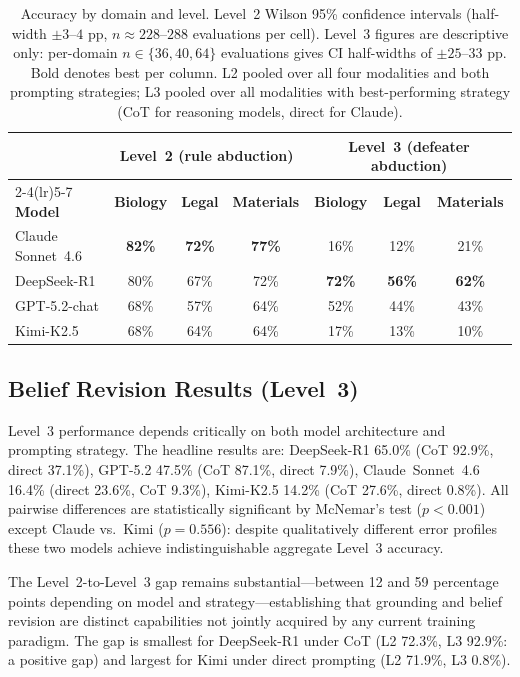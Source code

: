 \documentclass{article}
\theoremstyle{definition}
\begin{document}
\begin{table}[t]
\centering
\caption{Accuracy by domain and level. Level~2 Wilson 95\% confidence intervals (half-width $\pm 3$--$4$ pp, $n \approx 228$--$288$ evaluations per cell). Level~3 figures are descriptive only: per-domain $n \in \{36, 40, 64\}$ evaluations gives CI half-widths of $\pm 25$--$33$ pp. Bold denotes best per column. L2 pooled over all four modalities and both prompting strategies; L3 pooled over all modalities with best-performing strategy (CoT for reasoning models, direct for Claude).}
\label{tab:domain_breakdown}
\small
\setlength{\tabcolsep}{5pt}
\begin{tabular}{@{}lcccccc@{}}
\toprule
 & \multicolumn{3}{c}{\textbf{Level~2 (rule abduction)}} & \multicolumn{3}{c}{\textbf{Level~3 (defeater abduction)}} \\
\cmidrule(lr){2-4}\cmidrule(lr){5-7}
\textbf{Model} & \textbf{Biology} & \textbf{Legal} & \textbf{Materials} & \textbf{Biology} & \textbf{Legal} & \textbf{Materials} \\
\midrule
Claude Sonnet~4.6   & \textbf{82\%} & \textbf{72\%} & \textbf{77\%} & 16\% & 12\% & 21\% \\
DeepSeek-R1         & 80\% & 67\% & 72\% & \textbf{72\%} & \textbf{56\%} & \textbf{62\%} \\
GPT-5.2-chat        & 68\% & 57\% & 64\% & 52\% & 44\% & 43\% \\
Kimi-K2.5           & 68\% & 64\% & 64\% & 17\% & 13\% & 10\% \\
\bottomrule
\end{tabular}
\end{table}

\subsection{Belief Revision Results (Level~3)}\label{subsec:revision_results}

Level~3 performance depends critically on both model architecture and prompting strategy. The headline results are: DeepSeek-R1 65.0\% (CoT 92.9\%, direct 37.1\%), GPT-5.2 47.5\% (CoT 87.1\%, direct 7.9\%), Claude~Sonnet~4.6 16.4\% (direct 23.6\%, CoT 9.3\%), Kimi-K2.5 14.2\% (CoT 27.6\%, direct 0.8\%). All pairwise differences are statistically significant by McNemar's test ($p < 0.001$) except Claude vs.\ Kimi ($p = 0.556$): despite qualitatively different error profiles these two models achieve indistinguishable aggregate Level~3 accuracy.

The Level~2-to-Level~3 gap remains substantial---between 12 and 59 percentage points depending on model and strategy---establishing that grounding and belief revision are distinct capabilities not jointly acquired by any current training paradigm. The gap is smallest for DeepSeek-R1 under CoT (L2 72.3\%, L3 92.9\%: a positive gap) and largest for Kimi under direct prompting (L2 71.9\%, L3 0.8\%).
\end{document}
